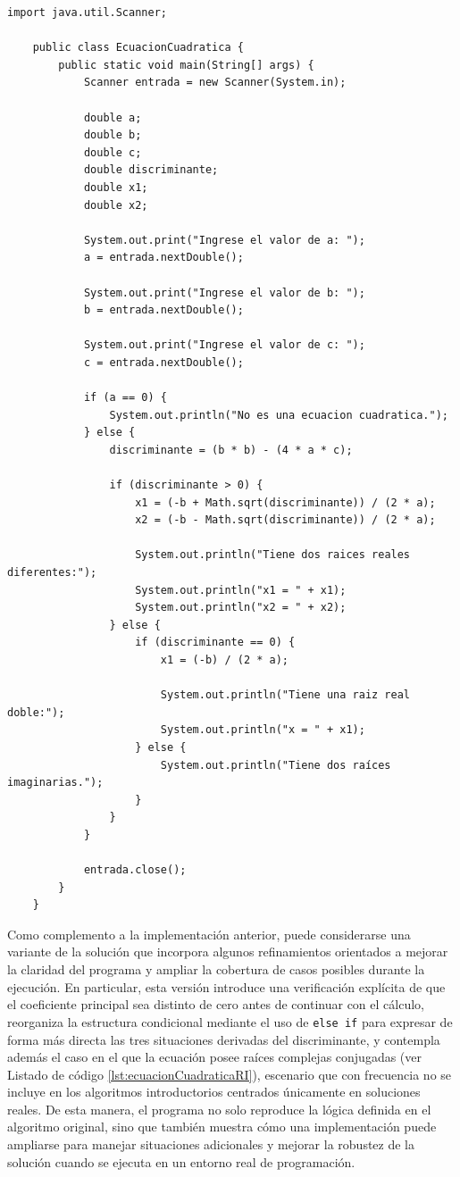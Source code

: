 \documentclass[12pt,twoside]{book}
\begin{document}
					\begin{lstlisting}[style=Java,caption={Resolución de una ecuación cuadrática},label={lst:ecuacionCuadratica}]
	import java.util.Scanner;
	
	public class EcuacionCuadratica {
		public static void main(String[] args) {
			Scanner entrada = new Scanner(System.in);
			
			double a;
			double b;
			double c;
			double discriminante;
			double x1;
			double x2;
			
			System.out.print("Ingrese el valor de a: ");
			a = entrada.nextDouble();
			
			System.out.print("Ingrese el valor de b: ");
			b = entrada.nextDouble();
			
			System.out.print("Ingrese el valor de c: ");
			c = entrada.nextDouble();
			
			if (a == 0) {
				System.out.println("No es una ecuacion cuadratica.");
			} else {
				discriminante = (b * b) - (4 * a * c);
				
				if (discriminante > 0) {
					x1 = (-b + Math.sqrt(discriminante)) / (2 * a);
					x2 = (-b - Math.sqrt(discriminante)) / (2 * a);
					
					System.out.println("Tiene dos raices reales diferentes:");
					System.out.println("x1 = " + x1);
					System.out.println("x2 = " + x2);
				} else {
					if (discriminante == 0) {
						x1 = (-b) / (2 * a);
						
						System.out.println("Tiene una raiz real doble:");
						System.out.println("x = " + x1);
					} else {
						System.out.println("Tiene dos raíces imaginarias.");
					}
				}
			}
			
			entrada.close();
		}
	} \end{lstlisting}

					\noindent
					Como complemento a la implementación anterior, puede considerarse una variante de la solución que incorpora algunos refinamientos orientados a mejorar la claridad del programa y ampliar la cobertura de casos posibles durante la ejecución. En particular, esta versión introduce una verificación explícita de que el coeficiente principal sea distinto de cero antes de continuar con el cálculo, reorganiza la estructura condicional mediante el uso de \texttt{else if} para expresar de forma más directa las tres situaciones derivadas del discriminante, y contempla además el caso en el que la ecuación posee raíces complejas conjugadas (ver Listado de código \ref{lst:ecuacionCuadraticaRI}), escenario que con frecuencia no se incluye en los algoritmos introductorios centrados únicamente en soluciones reales. De esta manera, el programa no solo reproduce la lógica definida en el algoritmo original, sino que también muestra cómo una implementación puede ampliarse para manejar situaciones adicionales y mejorar la robustez de la solución cuando se ejecuta en un entorno real de programación.
						
\end{document}
